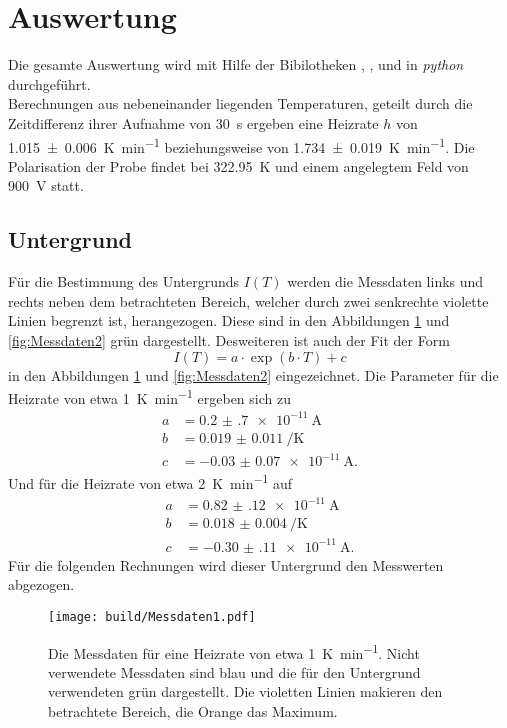 \newpage
\section{Auswertung}
\label{sec:Auswertung}
Die gesamte Auswertung wird mit Hilfe der Bibilotheken \cite{matplotlib}, \cite{numpy}, \cite{scipy} und
\cite{uncertainties} in \textit{python} durchgeführt. \\
Berechnungen aus nebeneinander liegenden Temperaturen, geteilt durch die Zeitdifferenz ihrer Aufnahme von \SI{30}{\second}
ergeben eine Heizrate $h$ von \SI{1.015(6)}{\kelvin\per\minute} beziehungsweise von \SI{1.734(19)}{\kelvin\per\minute}.
Die Polarisation der Probe findet bei \SI{322.95}{\kelvin} und einem angelegtem Feld von \SI{900}{\volt} statt.

\subsection{Untergrund}
\label{sec:Unter}
Für die Bestimmung des Untergrunds $I(T)$ werden die Messdaten links und rechts neben dem betrachteten Bereich,
welcher durch zwei senkrechte violette Linien begrenzt ist, 
herangezogen. Diese sind in den Abbildungen \ref{fig:Messdaten1} und \ref{fig:Messdaten2} grün dargestellt.
Desweiteren ist auch der Fit der Form
\begin{equation}
    \label{eqn:exp}
    I(T) = a \cdot \exp \left(b\cdot T \right) + c
\end{equation}
in den Abbildungen \ref{fig:Messdaten1} und \ref{fig:Messdaten2} eingezeichnet.
Die Parameter für die Heizrate von etwa \SI{1}{\kelvin\per\minute} ergeben sich zu
\begin{align*}
    a &= \SI{0.2(7)e-11}{\ampere} \\
    b &= \SI{0.019(11)}{\per\kelvin} \\
    c &= \SI{-0.03(7)e-11}{\ampere}.
\end{align*}
Und für die Heizrate von etwa \SI{2}{\kelvin\per\minute} auf
\begin{align*}
    a &= \SI{0.82(12)e-11}{\ampere} \\
    b &= \SI{0.018(4)}{\per\kelvin} \\
    c &= \SI{-0.30(11)e-11}{\ampere}.
\end{align*}
Für die folgenden Rechnungen wird dieser Untergrund den Messwerten abgezogen.
\begin{figure}[htb]
  \centering
  \texttt{[image: build/Messdaten1.pdf]}
  \caption{Die Messdaten für eine Heizrate von etwa \SI{1}{\kelvin\per\minute}. Nicht verwendete Messdaten sind blau und die für den Untergrund verwendeten grün dargestellt. Die violetten Linien makieren den betrachtete Bereich, die Orange das Maximum.}
  \label{fig:Messdaten1}
\end{figure}

